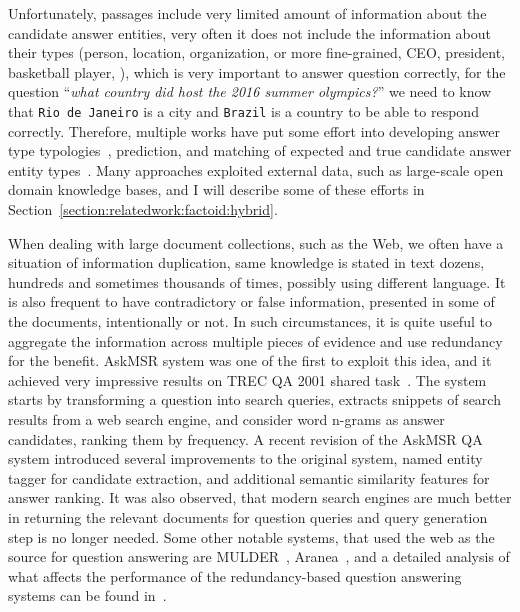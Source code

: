 Unfortunately, passages include very limited amount of information about the candidate answer entities, \ie very often it does not include the information about their types (person, location, organization, or more fine-grained, CEO, president, basketball player, \etc), which is very important to answer question correctly, \eg for the question ``\textit{what country did host the 2016 summer olympics?}'' we need to know that \texttt{Rio de Janeiro} is a city and \texttt{Brazil} is a country to be able to respond correctly.
Therefore, multiple works have put some effort into developing answer type typologies~\cite{Hovy:2002:QTS:1289189.1289206,hovy2000question}, prediction, and matching of expected and true candidate answer entity types~\cite{LiRoth02,li2006learning,prager2006question}.
Many approaches exploited external data, such as large-scale open domain knowledge bases, and I will describe some of these efforts in Section~\ref{section:relatedwork:factoid:hybrid}.

When dealing with large document collections, such as the Web, we often have a situation of information duplication, \eg same knowledge is stated in text dozens, hundreds and sometimes thousands of times, possibly using different language.
It is also frequent to have contradictory or false information, presented in some of the documents, intentionally or not.
In such circumstances, it is quite useful to aggregate the information across multiple pieces of evidence and use redundancy for the benefit.
AskMSR system was one of the first to exploit this idea, and it achieved very impressive results on TREC QA 2001 shared task~\cite{brill2002analysis}.
The system starts by transforming a question into search queries, extracts snippets of search results from a web search engine, and consider word n-grams as answer candidates, ranking them by frequency.
A recent revision of the AskMSR QA system \cite{tsai2015web} introduced several improvements to the original system, \ie named entity tagger for candidate extraction, and additional semantic similarity features for answer ranking.
It was also observed, that modern search engines are much better in returning the relevant documents for question queries and query generation step is no longer needed.
Some other notable systems, that used the web as the source for question answering are MULDER~\cite{kwok2001scaling}, Aranea~\cite{lin2003question}, and a detailed analysis of what affects the performance of the redundancy-based question answering systems can be found in~\cite{clarke2001exploiting,lin2007exploration}.

